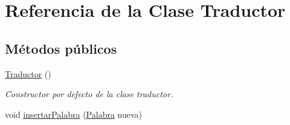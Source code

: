 \hypertarget{classTraductor}{\section{\-Referencia de la \-Clase \-Traductor}
\label{classTraductor}
}
\subsection*{\-Métodos públicos}
\begin{DoxyCompactItemize}
\item 
\hyperlink{classTraductor_a9723a49b5b82689bff2b827ca2da3f45}{\-Traductor} ()
\begin{DoxyCompactList}\small\item\em \-Constructor por defecto de la clase traductor. \end{DoxyCompactList}\item 
\hypertarget{classTraductor_a0371e5ebcbb3cd4f0b6dc2759013e19e}{void \hyperlink{classTraductor_a0371e5ebcbb3cd4f0b6dc2759013e19e}{insertar\-Palabra} (\hyperlink{classPalabra}{\-Palabra} nueva)}\label{classTraductor_a0371e5ebcbb3cd4f0b6dc2759013e19e}


\end{DoxyCompactItemize}
